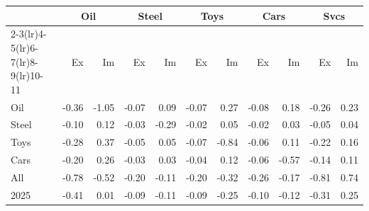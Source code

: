 \begin{tabular}{lrrrrrrrrrr}
\toprule
 & \multicolumn{2}{c}{Oil} & \multicolumn{2}{c}{Steel} & \multicolumn{2}{c}{Toys} & \multicolumn{2}{c}{Cars} & \multicolumn{2}{c}{Svcs} \\
\cmidrule(lr){2-3}\cmidrule(lr){4-5}\cmidrule(lr){6-7}\cmidrule(lr){8-9}\cmidrule(lr){10-11}
 & Ex & Im & Ex & Im & Ex & Im & Ex & Im & Ex & Im \\
\midrule
Oil & -0.36 & -1.05 & -0.07 & 0.09 & -0.07 & 0.27 & -0.08 & 0.18 & -0.26 & 0.23 \\
Steel & -0.10 & 0.12 & -0.03 & -0.29 & -0.02 & 0.05 & -0.02 & 0.03 & -0.05 & 0.04 \\
Toys & -0.28 & 0.37 & -0.05 & 0.05 & -0.07 & -0.84 & -0.06 & 0.11 & -0.22 & 0.16 \\
Cars & -0.20 & 0.26 & -0.03 & 0.03 & -0.04 & 0.12 & -0.06 & -0.57 & -0.14 & 0.11 \\
All & -0.78 & -0.52 & -0.20 & -0.11 & -0.20 & -0.32 & -0.26 & -0.17 & -0.81 & 0.74 \\
2025 & -0.41 & 0.01 & -0.09 & -0.11 & -0.09 & -0.25 & -0.10 & -0.12 & -0.31 & 0.25 \\
\bottomrule
\end{tabular}
